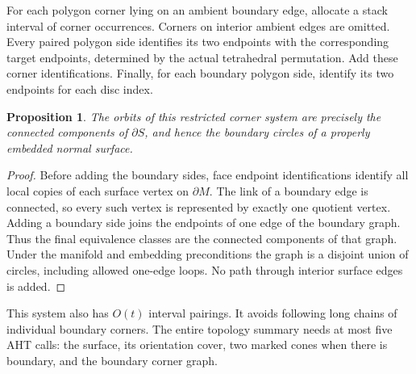 \documentclass[11pt,a4paper]{article}
\newtheorem{proposition}[theorem]{Proposition}
\theoremstyle{definition}\newtheorem{definition}[theorem]{Definition}
\theoremstyle{remark}\newtheorem{remark}[theorem]{Remark}
\begin{document}
For each polygon corner lying on an ambient boundary edge, allocate a
stack interval of corner occurrences. Corners on interior ambient edges
are omitted. Every paired polygon side identifies its two endpoints with
the corresponding target endpoints, determined by the actual tetrahedral
permutation. Add these corner identifications. Finally, for each boundary
polygon side, identify its two endpoints for each disc index.

\begin{proposition}\label{prop:boundary}
The orbits of this restricted corner system are precisely the connected
components of $\partial S$, and hence the boundary circles of a properly
embedded normal surface.
\end{proposition}
\begin{proof}
Before adding the boundary sides, face endpoint identifications identify
all local copies of each surface vertex on $\partial M$. The link of a
boundary edge is connected, so every such vertex is represented by exactly
one quotient vertex. Adding a boundary side joins the endpoints of one
edge of the boundary graph. Thus the final equivalence classes are the
connected components of that graph. Under the manifold and embedding
preconditions the graph is a disjoint union of circles, including allowed
one-edge loops. No path through interior surface edges is added.
\end{proof}

This system also has $O(t)$ interval pairings. It avoids following long
chains of individual boundary corners. The entire topology summary needs
at most five AHT calls: the surface, its orientation cover, two marked
cones when there is boundary, and the boundary corner graph.
\end{document}
